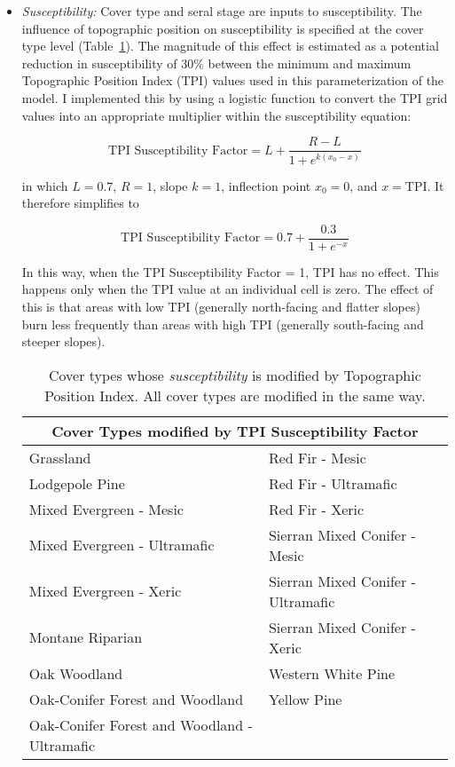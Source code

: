 \begin{itemize}

\item \emph{Susceptibility:} Cover type and seral stage are inputs to susceptibility. The influence of topographic position on susceptibility is specified at the cover type level (Table~\ref{covtpi}). The magnitude of this effect is estimated as a potential reduction in susceptibility of 30\% between the minimum and maximum Topographic Position Index (TPI) values used in this parameterization of the model. I implemented this by using a logistic function to convert the TPI grid values into an appropriate multiplier within the susceptibility equation:

$$\text{TPI Susceptibility Factor} = L + \frac{R-L}{1+e^{k(x_0-x)}}$$

in which $L= 0.7$, $R=1$, slope $k=1$, inflection point $x_0=0$, and $x=\text{TPI}$. %
It therefore simplifies to 

$$\text{TPI Susceptibility Factor} = 0.7 + \frac{0.3}{1+e^{-x}}$$

In this way, when the TPI Susceptibility Factor = 1, TPI has no effect. This happens only when the TPI value at an individual cell is zero. The effect of this is that areas with low TPI (generally north-facing and flatter slopes) burn less frequently than areas with high TPI (generally south-facing and steeper slopes).


\begin{table}[htbp]
\footnotesize
\centering
\caption{Cover types whose \emph{susceptibility} is modified by Topographic Position Index. All cover types are modified in the same way.}
\label{covtpi}
\begin{tabular}{ll}
\hline
\multicolumn{2}{c}{\textbf{Cover Types modified by TPI Susceptibility Factor}} \\
\hline
Grassland     					& Red Fir - Mesic   			\\
Lodgepole Pine    				& Red Fir - Ultramafic			\\
Mixed Evergreen - Mesic				& Red Fir - Xeric    			\\
Mixed Evergreen - Ultramafic     		& Sierran Mixed Conifer - Mesic    	\\
Mixed Evergreen - Xeric 			& Sierran Mixed Conifer - Ultramafic 	\\
Montane Riparian				& Sierran Mixed Conifer - Xeric 	\\
Oak Woodland 					& Western White Pine			\\
Oak-Conifer Forest and Woodland 		& Yellow Pine 				\\
Oak-Conifer Forest and Woodland - Ultramafic 	&					\\
\hline
\end{tabular}


\end{table}
\end{itemize}
